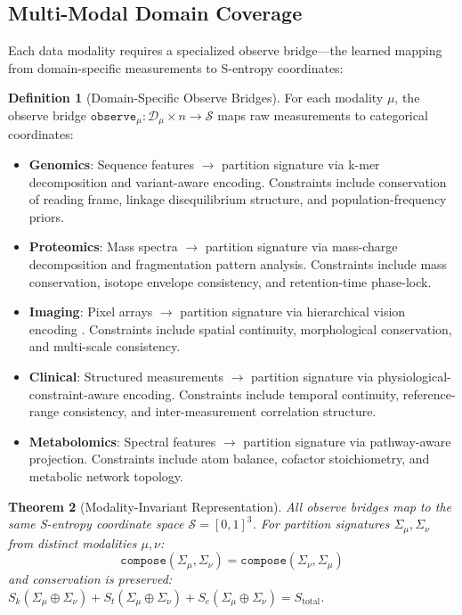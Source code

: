 \documentclass[10pt,twocolumn]{article}
\newtheorem{theorem}{Theorem}[section]
\theoremstyle{definition}
\newtheorem{definition}[theorem]{Definition}
\theoremstyle{remark}
\newcommand{\Sk}{S_k}
\newcommand{\St}{S_t}
\newcommand{\Se}{S_e}
\newcommand{\Sspace}{\mathcal{S}}
\newcommand{\dataset}{\mathcal{D}}
\newcommand{\Sk}{\mathscr{S}_k}
\newcommand{\Se}{\mathscr{S}_e}
\begin{document}
\subsection{Multi-Modal Domain Coverage}

Each data modality requires a specialized observe bridge---the learned mapping from domain-specific measurements to S-entropy coordinates:

\begin{definition}[Domain-Specific Observe Bridges]
\label{def:bridges}
For each modality $\mu$, the observe bridge $\texttt{observe}_\mu : \dataset_\mu \times n \to \Sspace$ maps raw measurements to categorical coordinates:
\begin{itemize}[nosep]
\item \textbf{Genomics}: Sequence features $\to$ partition signature via k-mer decomposition and variant-aware encoding. Constraints include conservation of reading frame, linkage disequilibrium structure, and population-frequency priors.
\item \textbf{Proteomics}: Mass spectra $\to$ partition signature via mass-charge decomposition and fragmentation pattern analysis. Constraints include mass conservation, isotope envelope consistency, and retention-time phase-lock.
\item \textbf{Imaging}: Pixel arrays $\to$ partition signature via hierarchical vision encoding \cite{oquab2024}. Constraints include spatial continuity, morphological conservation, and multi-scale consistency.
\item \textbf{Clinical}: Structured measurements $\to$ partition signature via physiological-constraint-aware encoding. Constraints include temporal continuity, reference-range consistency, and inter-measurement correlation structure.
\item \textbf{Metabolomics}: Spectral features $\to$ partition signature via pathway-aware projection. Constraints include atom balance, cofactor stoichiometry, and metabolic network topology.
\end{itemize}
\end{definition}

\begin{theorem}[Modality-Invariant Representation]
\label{thm:modality_invariant}
All observe bridges map to the same S-entropy coordinate space $\Sspace = [0,1]^3$. For partition signatures $\Sigma_\mu, \Sigma_\nu$ from distinct modalities $\mu, \nu$:
\begin{equation}
\texttt{compose}(\Sigma_\mu, \Sigma_\nu) = \texttt{compose}(\Sigma_\nu, \Sigma_\mu)
\end{equation}
and conservation is preserved: $\Sk(\Sigma_\mu \oplus \Sigma_\nu) + \St(\Sigma_\mu \oplus \Sigma_\nu) + \Se(\Sigma_\mu \oplus \Sigma_\nu) = S_{\text{total}}$.
\end{theorem}
\end{document}
